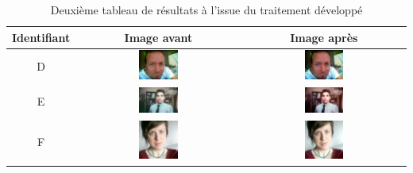 \documentclass[11pt, french,screen]{report-rd-info}
\begin{document}
\begin{table}
\centering
\begin{tabular}{|c|c|c|}	
   \hline \textbf{Identifiant}  &  \textbf{Image avant}  &  \textbf{Image après}  \\ \hline 
   D & \includegraphics[width=0.25\textwidth]{Resultats/pd_avant} & \includegraphics[width=0.25\textwidth]{Resultats/pd_apres} \\ \hline   
   E & \includegraphics[width=0.25\textwidth]{Resultats/pe_avant} & \includegraphics[width=0.25\textwidth]{Resultats/pe_apres} \\ \hline   
   F & \includegraphics[width=0.25\textwidth]{Resultats/pf_avant} & \includegraphics[width=0.25\textwidth]{Resultats/pf_apres} \\ \hline
\end{tabular}
\caption{Deuxième tableau de résultats à l'issue du traitement développé}
\label{tab:Resultats2}
\end{table}
\end{document}
